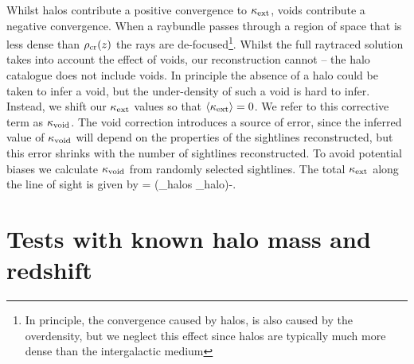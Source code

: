 \documentclass[useAMS,usenatbib]{mn2e}
\begin{document}
Whilst halos contribute a positive convergence to $\kappa_{\rm ext}$, voids contribute a negative convergence. When a raybundle passes through a 
region of space that is less dense than $\rho_{\rm cr}(z)$ the rays are de-focused\footnote{In principle, the convergence caused by halos, is also caused by the overdensity, but we neglect this effect since halos are typically much more dense than the intergalactic medium}. Whilst the 
full raytraced solution takes into account the effect of voids, our reconstruction cannot -- the halo catalogue does not include voids. In principle the absence of a halo could be taken to infer a void, but the under-density of such a void is hard to infer. Instead, we shift our $\kappa_{\rm ext}$ values so that $\langle\kappa_{\rm ext}\rangle=0$. We refer to this corrective term as $\kappa_{\rm void}$. The void correction introduces a source of error, since the inferred value of $\kappa_{\rm void}$ will depend on the properties of the sightlines reconstructed, but this error shrinks with the number of sightlines reconstructed. To avoid potential biases we calculate $\kappa_{\rm void}$ from randomly selected sightlines. The total $\kappa_{\rm ext}$ along the line of sight is given by 
\be \label{eq:totalkappax}
\kappax = \left(\sum_{\rm halos} \kappa_{\rm halo}\right)-\kappav.
\ee


\section{Tests with known halo mass and redshift}
\label{sec:knownMh+z} 

%
\end{document}
